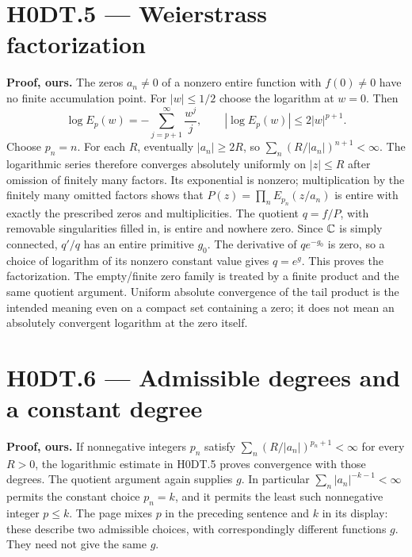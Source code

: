 \section*{H0DT.5 --- Weierstrass factorization}
\textbf{Proof, ours.} The zeros $a_n\ne0$ of a nonzero entire function with $f(0)\ne0$ have no finite accumulation point. For $|w|\le1/2$ choose the logarithm at $w=0$. Then
\[
 \log E_p(w)=-\sum_{j=p+1}^\infty\frac{w^j}{j},\qquad
 |\log E_p(w)|\le2|w|^{p+1}.
\]
Choose $p_n=n$. For each $R$, eventually $|a_n|\ge2R$, so $\sum_n(R/|a_n|)^{n+1}<\infty$. The logarithmic series therefore converges absolutely uniformly on $|z|\le R$ after omission of finitely many factors. Its exponential is nonzero; multiplication by the finitely many omitted factors shows that $P(z)=\prod_nE_{p_n}(z/a_n)$ is entire with exactly the prescribed zeros and multiplicities. The quotient $q=f/P$, with removable singularities filled in, is entire and nowhere zero. Since $\mathbb C$ is simply connected, $q'/q$ has an entire primitive $g_0$. The derivative of $q e^{-g_0}$ is zero, so a choice of logarithm of its nonzero constant value gives $q=e^g$. This proves the factorization. The empty/finite zero family is treated by a finite product and the same quotient argument. Uniform absolute convergence of the tail product is the intended meaning even on a compact set containing a zero; it does not mean an absolutely convergent logarithm at the zero itself.

\section*{H0DT.6 --- Admissible degrees and a constant degree}
\textbf{Proof, ours.} If nonnegative integers $p_n$ satisfy $\sum_n(R/|a_n|)^{p_n+1}<\infty$ for every $R>0$, the logarithmic estimate in H0DT.5 proves convergence with those degrees. The quotient argument again supplies $g$. In particular $\sum_n|a_n|^{-k-1}<\infty$ permits the constant choice $p_n=k$, and it permits the least such nonnegative integer $p\le k$. The page mixes $p$ in the preceding sentence and $k$ in its display: these describe two admissible choices, with correspondingly different functions $g$. They need not give the same $g$.

